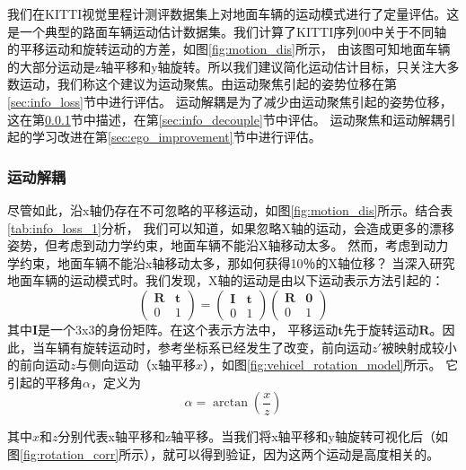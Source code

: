 我们在KITTI视觉里程计测评数据集\cite{geiger2012kitti}上对地面车辆的运动模式进行了定量评估。这是一个典型的路面车辆运动估计数据集。我们计算了KITTI序列00中关于不同轴
的平移运动和旋转运动的方差，如图\ref{fig:motion_dis}所示，%
由该图可知地面车辆的大部分运动是z轴平移和y轴旋转。所以我们建议简化运动估计目标，只关注大多数运动，我们称这个建议为运动聚焦。由运动聚焦引起的姿势位移在第\ref{sec:info_loss}节中进行评估。
运动解耦是为了减少由运动聚焦引起的姿势位移，这在第\ref{sec:motion_decouple}节中描述，在第\ref{sec:info_decouple}节中评估。
运动聚焦和运动解耦引起的学习改进在第\ref{sec:ego_improvement}节中进行评估。


\subsubsection{运动解耦}
\label{sec:motion_decouple}
尽管如此，沿x轴仍存在不可忽略的平移运动，如图\ref{fig:motion_dis}所示。结合表\ref{tab:info_loss_1}分析，
我们可以知道，如果忽略X轴的运动，会造成更多的漂移姿势，但考虑到动力学约束，地面车辆不能沿X轴移动太多。
然而，考虑到动力学约束，地面车辆不能沿x轴移动太多，那如何获得10％的X轴位移？
当深入研究地面车辆的运动模式时。我们发现，X轴的运动是由以下运动表示方法引起的：
\begin{equation}
    \begin{pmatrix} \mathbf{R} & \mathbf{t}\\ 0 & 1  \end{pmatrix} = \begin{pmatrix} \mathbf{I}& \mathbf{t}\\ 0 & 1  \end{pmatrix}\begin{pmatrix} \mathbf{R}& \mathbf{0}\\ 0 & 1  \end{pmatrix}
    \label{eq:ftlr}
\end{equation}
其中$\mathbf{I}$是一个3x3的身份矩阵。在这个表示方法中， 平移运动$\mathbf{t}$先于旋转运动$\mathbf{R}$。因此，当车辆有旋转运动时，参考坐标系已经发生了改变，前向运动{$z'$}被映射成较小的前向运动{$z$}与侧向运动（x轴平移{$x$}），如图\ref{fig:vehicel_rotation_model}所示。
它引起的平移角$\alpha$，定义为 
\begin{equation}
    \alpha = \arctan\left(\frac{x}{z}\right)
\end{equation}


其中$x$和$z$分别代表x轴平移和z轴平移。当我们将x轴平移和y轴旋转可视化后（如图\ref{fig:rotation_corr}所示），就可以得到验证，因为这两个运动是高度相关的。

